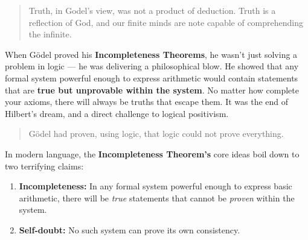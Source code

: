 

\begin{quote}
  Truth, in Godel's view, was not a product of deduction. Truth is a reflection of God, and our finite minds are note capable of comprehending the infinite.
\end{quote}

When Gödel proved his \textbf{Incompleteness Theorems}, he wasn’t just solving a problem in logic — he was delivering a philosophical blow. He showed that any formal system powerful enough to express arithmetic would contain statements that are \textbf{true but unprovable within the system}. No matter how complete your axioms, there will always be truths that escape them.  It was the end of Hilbert’s dream, and a direct challenge to logical positivism.

\begin{quote}
Gödel had proven, using logic, that logic could not prove everything.
\end{quote}


In modern language, the \textbf{Incompleteness Theorem's} core ideas boil down to two terrifying claims:

\begin{enumerate}
    \item \textbf{Incompleteness:} In any formal system powerful enough to express basic arithmetic, there will be \emph{true} statements that cannot be \emph{proven} within the system.
    \item \textbf{Self-doubt:} No such system can prove its own consistency.
\end{enumerate}

